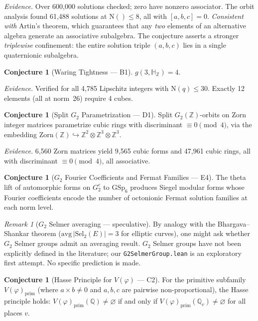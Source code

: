 \documentclass[11pt]{amsart}
\theoremstyle{plain}
\theoremstyle{definition}
\newtheorem{conjecture}[theorem]{Conjecture}
\theoremstyle{remark}
\newtheorem{remark}[theorem]{Remark}
\newcommand{\Z}{\mathbb{Z}}
\newcommand{\Q}{\mathbb{Q}}
\newcommand{\HH}{\mathbb{H}}
\newcommand{\Norm}[1]{\mathrm{N}(#1)}
\newcommand{\GSp}{\mathrm{GSp}}
\newcommand{\Sel}{\mathrm{Sel}}
\begin{document}
\noindent
\emph{Evidence.} Over 600{,}000 solutions checked; zero have nonzero associator.
The orbit analysis found 61{,}488 solutions at $\Norm{} \leq 8$, all with
$[a, b, c] = 0$.
\emph{Consistent with} Artin's theorem, which guarantees that any \emph{two}
elements of an alternative algebra generate an associative subalgebra.
The conjecture asserts a stronger \emph{triplewise} confinement:
the entire solution triple $(a, b, c)$ lies in a single quaternionic subalgebra.

\begin{conjecture}[Waring Tightness --- B1]\label{conj:waring}
$g(3, \HH_\Z) = 4$.
\end{conjecture}

\noindent
\emph{Evidence.} Verified for all 4{,}785 Lipschitz integers with $\Norm{q} \leq 30$.
Exactly 12 elements (all at norm~26) require 4 cubes.

\begin{conjecture}[Split $G_2$ Parametrization --- D1]\label{conj:splitg2}
Split $G_2(\Z)$-orbits on Zorn integer matrices parametrize cubic rings
with discriminant $\equiv 0 \pmod{4}$, via the embedding
$\mathrm{Zorn}(\Z) \hookrightarrow \Z^2 \otimes \Z^3 \otimes \Z^3$.
\end{conjecture}

\noindent
\emph{Evidence.} 6{,}560 Zorn matrices yield 9{,}565 cubic forms and 47{,}961 cubic rings,
all with discriminant $\equiv 0 \pmod{4}$, all associative.

\begin{conjecture}[$G_2$ Fourier Coefficients and Fermat Families --- E4]\label{conj:fourier}
The theta lift of automorphic forms on $G_2^c$ to $\GSp_6$ produces
Siegel modular forms whose Fourier coefficients encode the number of
octonionic Fermat solution families at each norm level.
\end{conjecture}

\begin{remark}[$G_2$ Selmer averaging --- speculative]
By analogy with the Bhargava--Shankar theorem
($\mathrm{avg}\,|\Sel_2(E)| = 3$ for elliptic curves),
one might ask whether $G_2$ Selmer groups admit an averaging result.
$G_2$ Selmer groups have not been explicitly defined
in the literature; our \texttt{G2SelmerGroup.lean} is an exploratory first attempt.
No specific prediction is made.
\end{remark}

\begin{conjecture}[Hasse Principle for $V(\varphi)$ --- C2]\label{conj:hasse}
For the primitive subfamily $V(\varphi)_{\mathrm{prim}}$
(where $a \times b \neq 0$ and $a, b, c$ are pairwise non-proportional),
the Hasse principle holds: $V(\varphi)_{\mathrm{prim}}(\Q) \neq \varnothing$
if and only if $V(\varphi)_{\mathrm{prim}}(\Q_v) \neq \varnothing$ for all places $v$.
\end{conjecture}
\end{document}
